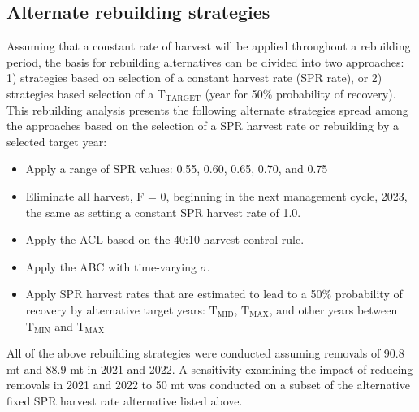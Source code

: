\documentclass[11pt,
  english,
  a4paper,
]{article}
\begin{document}
\leavevmode\tagmcend\tagstructend\par


\hypertarget{alternate-rebuilding-strategies}{%
\subsection{Alternate rebuilding strategies}\label{alternate-rebuilding-strategies}}

\leavevmode\tagmcend\tagstructend


Assuming that a constant rate of harvest will be applied throughout a rebuilding period, the basis for rebuilding alternatives can be divided into two approaches: 1) strategies based on selection of a constant harvest rate (SPR rate), or 2) strategies based selection of a {\(\text{T}_\text{TARGET}\)\leavevmode\tagmcend\tagstructend} (year for 50\% probability of recovery). This rebuilding analysis presents the following alternate strategies spread among the approaches based on the selection of a SPR harvest rate or rebuilding by a selected target year:

\leavevmode\tagmcend\tagstructend\par

\begin{itemize}
    \item Apply a range of SPR values: 0.55, 0.60, 0.65, 0.70, and 0.75 
    \item Eliminate all harvest, F = 0, beginning in the next management cycle, 2023, the same as setting a constant SPR harvest rate of 1.0.
    \item Apply the ACL based on the 40:10 harvest control rule.
    \item Apply the ABC with time-varying $\sigma$.
    \item Apply SPR harvest rates that are estimated to lead to a 50$\%$ probability of recovery by alternative target years: $\text{T}_\text{MID}$, $\text{T}_\text{MAX}$, and other years between $\text{T}_\text{MIN}$ and $\text{T}_\text{MAX}$
\end{itemize}


All of the above rebuilding strategies were conducted assuming removals of 90.8 mt and 88.9 mt in 2021 and 2022. A sensitivity examining the impact of reducing removals in 2021 and 2022 to 50 mt was conducted on a subset of the alternative fixed SPR harvest rate alternative listed above.
\end{document}
